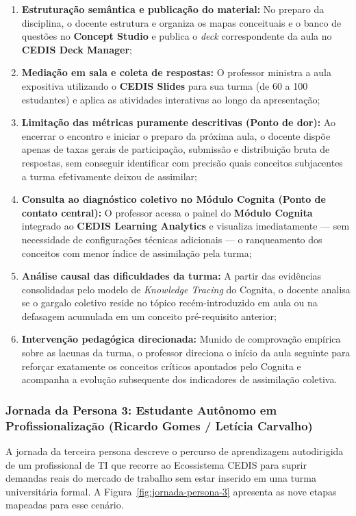 \begin{enumerate}
    \item \textbf{Estruturação semântica e publicação do material:} No preparo da disciplina, o docente estrutura e organiza os mapas conceituais e o banco de questões no \textbf{Concept Studio} e publica o \textit{deck} correspondente da aula no \textbf{CEDIS Deck Manager};
    \item \textbf{Mediação em sala e coleta de respostas:} O professor ministra a aula expositiva utilizando o \textbf{CEDIS Slides} para sua turma (de 60 a 100 estudantes) e aplica as atividades interativas ao longo da apresentação;
    \item \textbf{Limitação das métricas puramente descritivas (Ponto de dor):} Ao encerrar o encontro e iniciar o preparo da próxima aula, o docente dispõe apenas de taxas gerais de participação, submissão e distribuição bruta de respostas, sem conseguir identificar com precisão quais conceitos subjacentes a turma efetivamente deixou de assimilar;
    \item \textbf{Consulta ao diagnóstico coletivo no Módulo Cognita (Ponto de contato central):} O professor acessa o painel do \textbf{Módulo Cognita} integrado ao \textbf{CEDIS Learning Analytics} e visualiza imediatamente — sem necessidade de configurações técnicas adicionais — o ranqueamento dos conceitos com menor índice de assimilação pela turma;
    \item \textbf{Análise causal das dificuldades da turma:} A partir das evidências consolidadas pelo modelo de \textit{Knowledge Tracing} do Cognita, o docente analisa se o gargalo coletivo reside no tópico recém-introduzido em aula ou na defasagem acumulada em um conceito pré-requisito anterior;
    \item \textbf{Intervenção pedagógica direcionada:} Munido de comprovação empírica sobre as lacunas da turma, o professor direciona o início da aula seguinte para reforçar exatamente os conceitos críticos apontados pelo Cognita e acompanha a evolução subsequente dos indicadores de assimilação coletiva.
\end{enumerate}

\subsubsection{Jornada da Persona 3: Estudante Autônomo em Profissionalização (Ricardo Gomes / Letícia Carvalho)}
\label{subsubsec:jornada-persona-3}

A jornada da terceira persona descreve o percurso de aprendizagem autodirigida de um profissional de TI que recorre ao Ecossistema CEDIS para suprir demandas reais do mercado de trabalho sem estar inserido em uma turma universitária formal. A Figura~\ref{fig:jornada-persona-3} apresenta as nove etapas mapeadas para esse cenário.


